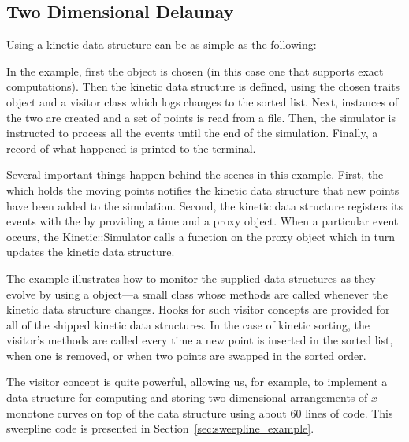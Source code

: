 \subsection{Two Dimensional Delaunay}
\label{sec:sort_example}

Using a kinetic data structure can be as simple as the following:
\label{fig:sort_program}

In the example, first the  object is chosen
(in this case one that supports exact computations). Then the kinetic
data structure is defined, using the chosen traits object and a
visitor class which logs changes to the sorted list.  Next, instances
of the two are created and a set of points is read from a file. Then,
the simulator is instructed to process all the events until the end of
the simulation.  Finally, a record of what happened is printed to the
terminal.

Several important things happen behind the scenes in this example.
First, the  which holds the moving points
notifies the kinetic data structure that new points have been added to
the simulation. Second, the  kinetic data structure
registers its events with the  by providing a time
and a proxy object. When a particular event occurs, the
Kinetic::Simulator calls a function on the proxy object which in turn
updates the kinetic data structure.

The example illustrates how to monitor the supplied data structures as
they evolve by using a  object---a small class whose
methods are called whenever the kinetic data structure changes. Hooks
for such visitor concepts are provided for all of the shipped kinetic
data structures. In the case of kinetic sorting, the visitor's
methods are called every time a new point is inserted in the sorted
list, when one is removed, or when two points are swapped in the
sorted order. 


The visitor concept is quite powerful, allowing us, for example, to
implement a data structure for computing and storing two-dimensional
arrangements of $x$-monotone curves on top of the
 data structure using about 60
lines of code. This sweepline code is presented in
Section~\ref{sec:sweepline_example}.

